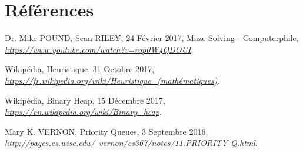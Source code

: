 \documentclass[10pt]{article}
\begin{document}
	\section{Références}
		\begin{thebibliography}{}
				Dr. Mike POUND, Sean RILEY, 24 Février 2017,\newline
				Maze Solving - Computerphile,\newline
				\href{https://www.youtube.com/watch?v=rop0W4QDOUI}{\textit{https://www.youtube.com/watch?v=rop0W4QDOUI}}.
			  
				Wikipédia, Heuristique, 31 Octobre 2017,\newline
				\href{https://fr.wikipedia.org/wiki/Heuristique_(mathématiques)}
				      {\textit{https://fr.wikipedia.org/wiki/Heuristique\_(mathématiques)}}.
			  
				Wikipédia, Binary Heap, 15 Décembre 2017,\newline
				\href{https://en.wikipedia.org/wiki/Binary\_heap}
				      {\textit{https://en.wikipedia.org/wiki/Binary\_heap}}.

				Mary K. VERNON, Priority Queues, 3 Septembre 2016,\newline
				\href{http://pages.cs.wisc.edu/~vernon/cs367/notes/11.PRIORITY-Q.html}
					{\textit{http://pages.cs.wisc.edu/~vernon/cs367/notes/11.PRIORITY-Q.html}}.

  \end{thebibliography}
\end{document}

